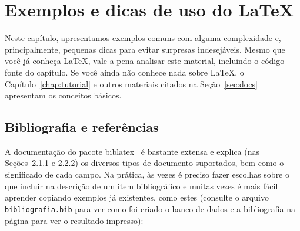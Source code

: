 
\chapter{Exemplos e dicas de uso do \LaTeX{}}
\label{chap:exemplos}

Neste capítulo, apresentamos exemplos comuns com alguma complexidade e,
principalmente, pequenas dicas para evitar surpresas indesejáveis. Mesmo
que você já conheça \LaTeX{}, vale a pena analisar este material, incluindo
o código-fonte do capítulo. Se você ainda não conhece nada sobre \LaTeX{},
o Capítulo~\ref{chap:tutorial} e outros materiais citados na
Seção~\ref{sec:docs} apresentam os conceitos básicos.

\section{Bibliografia e referências}

A documentação do pacote biblatex~\citep{biblatex} é
bastante extensa e explica (nas Seções~2.1.1 e 2.2.2) os diversos
tipos de documento suportados, bem como o significado de cada campo.
Na prática, às vezes é preciso fazer escolhas sobre
o que incluir na descrição de um item bibliográfico e muitas vezes
é mais fácil aprender copiando exemplos já existentes, como estes (consulte o
arquivo \texttt{bibliografia.bib} para ver como foi criado o banco de dados e a
bibliografia na página \pageref{bibliografia} para ver o resultado impresso):


